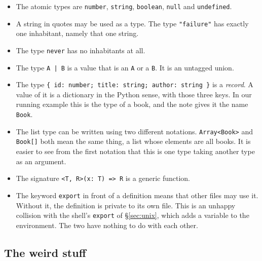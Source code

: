 \documentclass[11pt,a4paper]{article}
\begin{document}
\begin{listbox}
\begin{itemize}\setlength{\itemsep}{2pt}

\item The atomic types are \texttt{number}, \texttt{string}, \texttt{boolean}, \texttt{null} and
      \texttt{undefined}.

\item A string in quotes may be used as a type. The type \texttt{"failure"} has exactly one
      inhabitant, namely that one string.

\item The type \texttt{never} has no inhabitants at all.

\item The type \texttt{A | B} is a value that is an \texttt{A} or a \texttt{B}. It is an
      untagged union.

\item The type \texttt{\{ id: number; title: string; author: string \}} is a \emph{record}. A
      value of it is a dictionary in the Python sense, with those three keys. In our running
      example this is the type of a book, and the note gives it the name \texttt{Book}.

\item The list type can be written using two different notations. \texttt{Array<Book>} and
      \texttt{Book[]} both mean the same thing, a list whose elements are all books. It is
      easier to see from the first notation that this is one type taking another type as an
      argument.

\item The signature \texttt{<T, R>(x: T) => R} is a generic function.

\item The keyword \texttt{export} in front of a definition means that other files may use it.
      Without it, the definition is private to its own file. This is an unhappy collision with the
      shell's \texttt{export} of \S\ref{sec:unix}, which adds a variable to the environment.
      The two have nothing to do with each other.

\end{itemize}
\end{listbox}

\subsection{The weird stuff}
\end{document}
